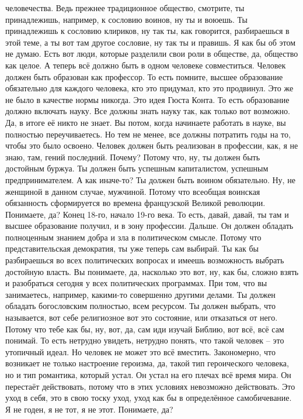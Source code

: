 человечества. Ведь прежнее традиционное общество, смотрите, ты принадлежишь,
например, к сословию воинов, ну ты и воюешь. Ты принадлежишь к сословию
клириков, ну так ты, как говорится, разбираешься в этой теме, а ты вот там
другое сословие, ну так ты и правишь. Я как бы об этом не думаю. Есть вот люди,
которые разделили свои роли в обществе, да, общество как целое. А теперь всё
должно быть в одном человеке совместиться. Человек должен быть образован как
профессор. То есть помните, высшее образование обязательно для каждого человека,
кто это придумал, кто это продвинул. Это же не было в качестве нормы никогда.
Это идея Гюста Конта. То есть образование должно включать науку. Все должны
знать науку так, как только вот возможно. Да, в итоге её никто не знает. Вы
потом, когда начинаете работать в науке, вы полностью переучиваетесь. Но тем не
менее, все должны потратить годы на то, чтобы это было освоено. Человек должен
быть реализован в профессии, как, я не знаю, там, гений последний. Почему?
Потому что, ну, ты должен быть достойным буржуа. Ты должен быть успешным
капиталистом, успешным предпринимателем. А как иначе-то? Ты должен быть воином
обязательно. Ну, не женщиной в данном случае, мужчиной. Потому что всеобщая
воинская обязанность сформируется во времена французской Великой революции.
Понимаете, да? Конец 18-го, начало 19-го века. То есть, давай, давай, ты там и
высшее образование получил, и в зону профессии. Дальше. Он должен обладать
полноценным знанием добра и зла в политическом смысле. Потому что
представительская демократия, ты уже теперь сам выбирай. Ты как бы разбираешься
во всех политических вопросах и имеешь возможность выбрать достойную власть. Вы
понимаете, да, насколько это вот, ну, как бы, сложно взять и разобраться сегодня
у всех политических программах. При том, что вы занимаетесь, например, какими-то
совершенно другими делами. Ты должен обладать богословским полностью, всем
ресурсом. Ты должен выбрать, что называется, вот себе религиозное вот это
состояние, или отказаться от него. Потому что тебе как бы, ну, вот, да, сам иди
изучай Библию, вот всё, всё сам понимай. То есть нетрудно увидеть, нетрудно
понять, что такой человек – это утопичный идеал. Но человек не может это всё
вместить. Закономерно, что возникает не только настроение героизма, да, такой
тип героического человека, но и тип романтика, который устал. Он устал на его
плечах всё время мира. Он перестаёт действовать, потому что в этих условиях
невозможно действовать. Это уход в себя, это в свою тоску уход, уход как бы в
определённое самобичевание. Я не годен, я не тот, я не этот. Понимаете, да?
